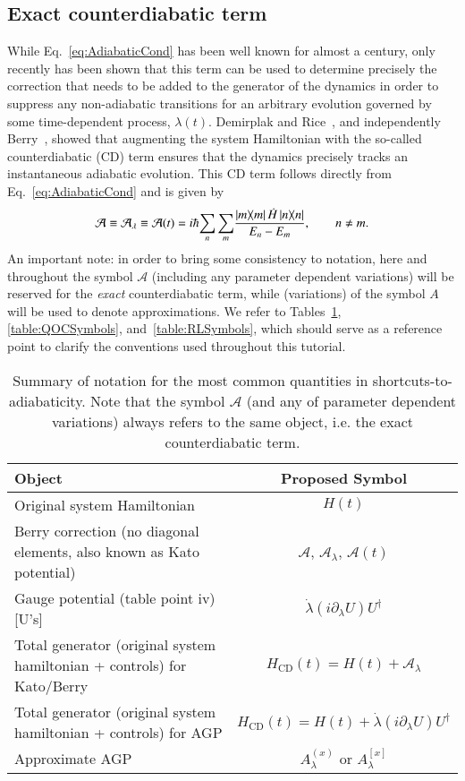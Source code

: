 \subsection{Exact counterdiabatic term}
\label{sec:CD}
While Eq.~\eqref{eq:AdiabaticCond} has been well known for almost a century, only recently has been shown that this term can be used to determine precisely the correction that needs to be added to the generator of the dynamics in order to suppress any non-adiabatic transitions for an arbitrary evolution governed by some time-dependent process, $\lambda(t)$. Demirplak and Rice~\cite{Demirplak2003, Demirplak2008}, and independently Berry~\cite{Berry2009}, showed that augmenting the system Hamiltonian with the so-called counterdiabatic (CD) term ensures that the dynamics precisely tracks an instantaneous adiabatic evolution. This CD term follows directly from Eq.~\eqref{eq:AdiabaticCond} and is given by
\begin{equation}
\label{HCD}
\mathcal{A} \equiv \mathcal{A}_\lambda \equiv \mathcal{A}(t)= i\hbar {\sum_{n} \sum_m} \frac{\ketbra{m}{m} \dot{H} \ketbra{n}{n}}{E_n - E_m},\qquad {n\neq m}.
\end{equation} 
An important note: in order to bring some consistency to notation, here and throughout the symbol $\mathcal{A}$ (including any parameter dependent variations) will be reserved for the {\it exact} counterdiabatic term, while (variations) of the symbol $A$ will be used to denote approximations. We refer to Tables~\ref{table:AGPsSymbols}, \ref{table:QOCSymbols}, and~\ref{table:RLSymbols}, which should serve as a reference point to clarify the conventions used throughout this tutorial. 
\begin{table}[!h]
\centering
\begin{tabular}{|p{12.5cm}|c|}
\hline
Object & Proposed Symbol \\
\hline\hline
Original system Hamiltonian & $H(t)$ \\
\hline
Berry correction (no diagonal elements, also known as Kato potential)& $\mathcal{A}$, $\mathcal{A}_\lambda$, $\mathcal{A}(t)$ \\
\hline
Gauge potential (table point iv) [U's] & $\dot{\lambda}(i \partial_\lambda U)U^{\dagger}$ \\
\hline
Total generator (original system hamiltonian + controls) for Kato/Berry & $H_\text{CD}(t)=H(t) + \mathcal{A}_\lambda$ \\
\hline
Total generator (original system hamiltonian + controls) for AGP & $H_\text{CD}(t)=H(t) + \dot{\lambda}(i \partial_\lambda U)U^{\dagger}$ \\
\hline
Approximate AGP & $A_\lambda^{(x)}$ or $A_\lambda^{[x]}$ \\
\hline
\end{tabular}
\caption{Summary of notation for the most common quantities in shortcuts-to-adiabaticity. Note that the symbol $\mathcal{A}$ (and any of parameter dependent variations) always refers to the same object, i.e. the exact counterdiabatic term.}
\label{table:AGPsSymbols}
\end{table}

